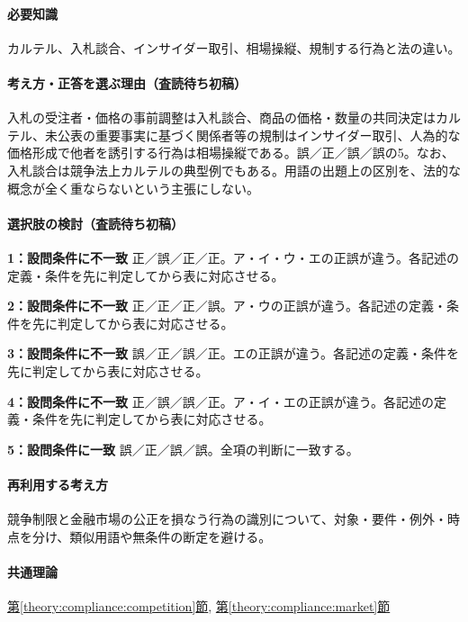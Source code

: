 \paragraph{必要知識} カルテル、入札談合、インサイダー取引、相場操縦、規制する行為と法の違い。

\paragraph{考え方・正答を選ぶ理由（査読待ち初稿）} 入札の受注者・価格の事前調整は入札談合、商品の価格・数量の共同決定はカルテル、未公表の重要事実に基づく関係者等の規制はインサイダー取引、人為的な価格形成で他者を誘引する行為は相場操縦である。誤／正／誤／誤の5。なお、入札談合は競争法上カルテルの典型例でもある。用語の出題上の区別を、法的な概念が全く重ならないという主張にしない。

\paragraph{選択肢の検討（査読待ち初稿）}\mbox{}\par

\noindent\textbf{1：設問条件に不一致} 正／誤／正／正。ア・イ・ウ・エの正誤が違う。各記述の定義・条件を先に判定してから表に対応させる。\par

\noindent\textbf{2：設問条件に不一致} 正／正／正／誤。ア・ウの正誤が違う。各記述の定義・条件を先に判定してから表に対応させる。\par

\noindent\textbf{3：設問条件に不一致} 誤／正／誤／正。エの正誤が違う。各記述の定義・条件を先に判定してから表に対応させる。\par

\noindent\textbf{4：設問条件に不一致} 正／誤／誤／正。ア・イ・エの正誤が違う。各記述の定義・条件を先に判定してから表に対応させる。\par

\noindent\textbf{5：設問条件に一致} 誤／正／誤／誤。全項の判断に一致する。\par

\paragraph{再利用する考え方} 競争制限と金融市場の公正を損なう行為の識別について、対象・要件・例外・時点を分け、類似用語や無条件の断定を避ける。

\paragraph{共通理論} \hyperref[theory:compliance:competition]{第\ref*{theory:compliance:competition}節}, \hyperref[theory:compliance:market]{第\ref*{theory:compliance:market}節}

